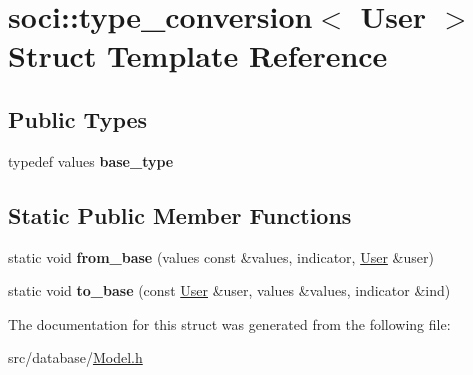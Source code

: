 \hypertarget{structsoci_1_1type__conversion_3_01_user_01_4}{\section{soci\-:\-:type\-\_\-conversion$<$ User $>$ Struct Template Reference}
\label{structsoci_1_1type__conversion_3_01_user_01_4}
}
\subsection*{Public Types}
\begin{DoxyCompactItemize}
\item 
\hypertarget{structsoci_1_1type__conversion_3_01_user_01_4_a10aca9348c15e1b1e75d4226262645c7}{typedef values {\bfseries base\-\_\-type}}\label{structsoci_1_1type__conversion_3_01_user_01_4_a10aca9348c15e1b1e75d4226262645c7}

\end{DoxyCompactItemize}
\subsection*{Static Public Member Functions}
\begin{DoxyCompactItemize}
\item 
\hypertarget{structsoci_1_1type__conversion_3_01_user_01_4_a3cfd0bb26f63f621a59a8bede9ea15d1}{static void {\bfseries from\-\_\-base} (values const \&values, indicator, \hyperlink{struct_user}{User} \&user)}\label{structsoci_1_1type__conversion_3_01_user_01_4_a3cfd0bb26f63f621a59a8bede9ea15d1}

\item 
\hypertarget{structsoci_1_1type__conversion_3_01_user_01_4_a6c7ebed969c8eebc0c2375498c948ec9}{static void {\bfseries to\-\_\-base} (const \hyperlink{struct_user}{User} \&user, values \&values, indicator \&ind)}\label{structsoci_1_1type__conversion_3_01_user_01_4_a6c7ebed969c8eebc0c2375498c948ec9}

\end{DoxyCompactItemize}


The documentation for this struct was generated from the following file\-:\begin{DoxyCompactItemize}
\item 
src/database/\hyperlink{_model_8h}{Model.\-h}\end{DoxyCompactItemize}
